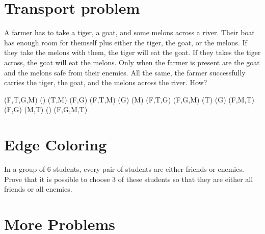 \documentclass[a4paper,12pt]{article}
\begin{document}
\section{Transport problem}
A farmer has to take a tiger, a goat, and some melons across a river. Their boat has enough room for themself plus either the tiger, the goat, or the melons. If they take the melons with them, the tiger will eat the goat. If they takes the tiger across, the goat will eat the melons. Only when the farmer is present are the goat and the melons safe from their enemies. All the same, the farmer successfully carries the tiger, the goat, and the melons across the river. How?

(F,T,G,M) ()
(T,M) (F,G)
(F,T,M) (G)
(M) (F,T,G)
(F,G,M) (T)
(G) (F,M,T)
(F,G) (M,T)
() (F,G,M,T)
\section{Edge Coloring}

In a group of 6 students, every pair of students are either friends or enemies. Prove that it is possible to choose 3 of these students so that they are either all friends or all enemies.


\section{More Problems}
\end{document}
